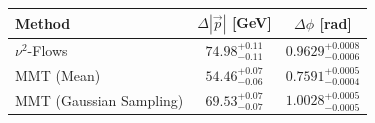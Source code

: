     \begin{tabular}{lcc}
        \toprule
        Method & $\Delta |\vec p|$ [GeV] & $\Delta \phi$ [rad] \\
        \midrule
        $\nu^2$-Flows & $74.98^{+0.11}_{-0.11}$ & $0.9629^{+0.0008}_{-0.0006}$ \\
        MMT (Mean) & $54.46^{+0.07}_{-0.06}$ & $0.7591^{+0.0005}_{-0.0004}$ \\
        MMT (Gaussian Sampling) & $69.53^{+0.07}_{-0.07}$ & $1.0028^{+0.0005}_{-0.0005}$ \\
        \bottomrule
    \end{tabular}